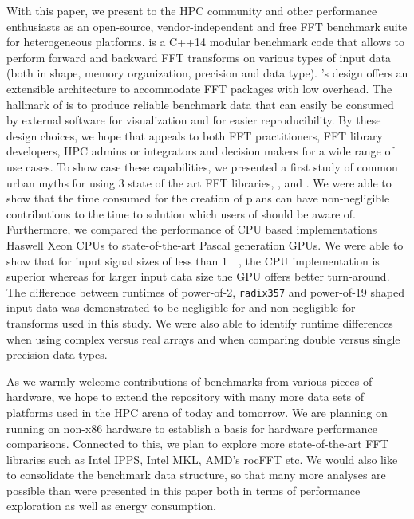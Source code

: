 
With this paper, we present \gearshifft{} to the HPC community and other performance enthusiasts as an open-source, vendor-independent and free FFT benchmark suite for heterogeneous platforms. \gearshifft{} is a C++14 modular benchmark code that allows to perform forward and backward FFT transforms on various types of input data (both in shape, memory organization, precision and data type). \gearshifft{}'s design offers an extensible architecture to accommodate FFT packages with low overhead. The hallmark of \gearshifft{} is to produce reliable benchmark data that can easily be consumed by external software for visualization and for easier reproducibility. By these design choices, we hope that \gearshifft{} appeals to both FFT practitioners, FFT library developers, HPC admins or integrators and decision makers for a wide range of use cases. To show case these capabilities, we presented a first study of common urban myths for using 3 state of the art FFT libraries, \fftw{}, \clfft{} and \cufft{}. We were able to show that the time consumed for the creation of \fftw{} plans can have non-negligible contributions to the time to solution which users of \fftw{} should be aware of. Furthermore, we compared the performance of CPU based implementations Haswell Xeon CPUs to state-of-the-art Pascal generation \nvidia{} GPUs. We were able to show that for input signal sizes of less than \SI{1}{\mebi\byte}, the CPU implementation is superior whereas for larger input data size the GPU offers better turn-around. The difference between runtimes of power-of-2, {\tt radix357} and power-of-19 shaped input data was demonstrated to be negligible for \fftw{} and non-negligible for \cufft{} transforms used in this study. We were also able to identify runtime differences when using complex versus real arrays and when comparing double versus single precision data types.     

As we warmly welcome contributions of benchmarks from various pieces of hardware, we hope to extend the \gearshifft{} repository with many more data sets of platforms used in the HPC arena of today and tomorrow. We are planning on running \gearshifft{} on non-x86 hardware to establish a basis for hardware performance comparisons. Connected to this, we plan to explore more state-of-the-art FFT libraries such as Intel IPPS, Intel MKL, AMD's rocFFT etc. We would also like to consolidate the benchmark data structure, so that many more analyses are possible than were presented in this paper both in terms of performance exploration as well as energy consumption.  

